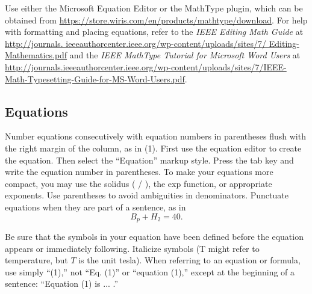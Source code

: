 \documentclass[letter]{IEEEtaes}
\begin{document}
Use either the Microsoft Equation Editor or the MathType plugin, which can be obtained from \href{https://store.wiris.com/en/products/mathtype/download}{https://store.wiris.com/en/products/mathtype/download}. For help with formatting and placing equations, refer to the {\it IEEE Editing Math Guide} at \href{http://journals.ieeeauthorcenter.ieee.org/wp-content/uploads/sites/7/Editing-Mathematics.pdf}{http://journals.\break 
ieeeauthorcenter.ieee.org/wp-content/uploads/sites/7/\break
Editing-Mathematics.pdf} and the {\it IEEE MathType Tutorial for Microsoft Word Users} at \href{http://journals.ieeeauthorcenter.ieee.org/wp-content/uploads/sites/7/IEEE-Math-Typesetting-Guide-for-MS-Word-Users.pdf}{%
\url{http://journals.ieeeauthorcenter.ieee.org/wp-content/uploads/sites/7/IEEE-Math-Typesetting-Guide-for-MS-Word-Users.pdf}}.



\subsection{Equations}

Number equations consecutively with equation numbers in parentheses flush with the right margin of the column, as in (1). First use the equation editor to create the equation. Then select the ``Equation'' markup style. Press the tab key and write the equation number in parentheses. To make your equations more compact, you may use the solidus ( / ), the exp function, or appropriate exponents. Use parentheses to avoid ambiguities in denominators. Punctuate equations when they are part of a sentence, as in
\begin{equation}
B_p+H_2=40.
\end{equation}

Be sure that the symbols in your equation have been defined before the equation appears or immediately following. Italicize symbols (T might refer to temperature, but $T$ is the unit tesla). When referring to an equation or formula, use simply ``(1),'' not ``Eq. (1)'' or ``equation (1),'' except at the beginning of a sentence: ``Equation (1) is ... .''
\end{document}
